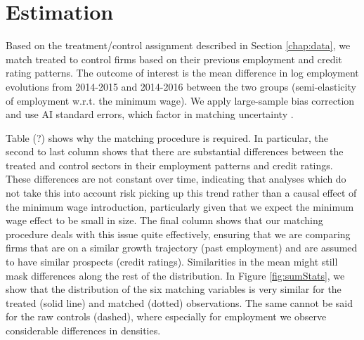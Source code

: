 \section{Estimation} \label{chap:results}
Based on the treatment/control assignment described in Section \ref{chap:data}, we match treated to control firms based on their previous employment and credit rating patterns. The outcome of interest is the mean difference in log employment evolutions from 2014-2015 and 2014-2016 between the two groups (semi-elasticity of employment w.r.t. the minimum wage). We apply large-sample bias correction and use AI standard errors, which factor in matching uncertainty \citep{Abadie2003,Abadie2006}.

Table (?) shows why the matching procedure is required. In particular, the second to last column shows that there are substantial differences between the treated and control sectors in their employment patterns and credit ratings. These differences are not constant over time, indicating that analyses which do not take this into account risk picking up this trend rather than a causal effect of the minimum wage introduction, particularly given that we expect the minimum wage effect to be small in size. The final column shows that our matching procedure deals with this issue quite effectively, ensuring that we are comparing firms that are on a similar growth trajectory (past employment) and are assumed to have similar prospects (credit ratings). Similarities in the mean might still mask differences along the rest of the distribution. In Figure \ref{fig:sumStats}, we show that the distribution of the six matching variables is very similar for the treated (solid line) and matched (dotted) observations. The same cannot be said for the raw controls (dashed), where especially for employment we observe considerable differences in densities.

